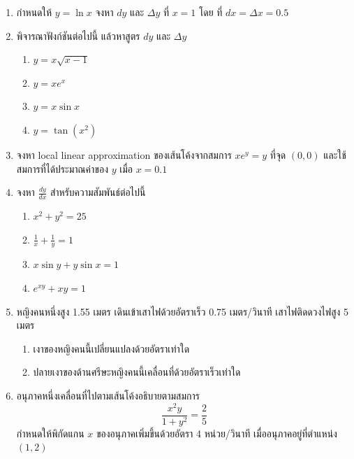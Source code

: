\documentclass[
]{book}
\begin{document}
\begin{enumerate}
\def\labelenumi{\arabic{enumi}.}
\item
  กำหนดให้ \(y= \ln x\) จงหา \(dy\) และ \(\Delta y\) ที่ \(x=1\) โดย ที่
  \(dx = \Delta x = 0.5\)
\item
  พิจารณาฟังก์ชันต่อไปนี้ แล้วหาสูตร \(dy\) และ \(\Delta y\)

  \begin{enumerate}
  \def\labelenumii{\arabic{enumii}.}
  \item
    \(\displaystyle y = x\sqrt{x-1}\)
  \item
    \(\displaystyle y = xe^x\)
  \item
    \(\displaystyle y = x\sin  x\)
  \item
    \(\displaystyle y = \tan (x^2)\)
  \end{enumerate}
\item
  จงหา local linear approximation ของเส้นโค้งจากสมการ \(xe^y = y\) ที่จุด
  \((0,0)\) และใช้สมการที่ได้ประมาณค่าของ \(y\) เมื่อ \(x=0.1\)
\item
  จงหา \(\frac{dy}{dx}\) สำหรับความสัมพันธ์ต่อไปนี้

  \begin{enumerate}
  \def\labelenumii{\arabic{enumii}.}
  \item
    \(x^2+ y^2 = 25\)
  \item
    \(\frac{1}{x} + \frac{1}{y} = 1\)
  \item
    \(x\sin y + y\sin x = 1\)
  \item
    \(e^{xy} + xy = 1\)
  \end{enumerate}
\item
  หญิงคนหนึ่งสูง 1.55 เมตร เดินเข้าเสาไฟด้วยอัตราเร็ว 0.75 เมตร/วินาที
  เสาไฟติดดวงไฟสูง 5 เมตร

  \begin{enumerate}
  \def\labelenumii{\arabic{enumii}.}
  \item
    เงาของหญิงคนนี้เปลี่ยนแปลงด้วยอัตราเท่าใด
  \item
    ปลายเงาของด้านศรีษะหญิงคนนี้เคลื่อนที่ด้วยอัตราเร็วเท่าใด
  \end{enumerate}
\item
  อนุภาคหนึ่งเคลื่อนที่ไปตามเส้นโค้งอธิบายตามสมการ
  \[\frac{x^2y}{1+y^2} = \frac{2}{5}\] กำหนดให้พิกัดแกน \(x\)
  ของอนุภาคเพิ่มขึ้นด้วยอัตรา 4 หน่วย/วินาที เมื่ออนุภาคอยู่ที่ตำแหน่ง \((1,2)\)


\end{enumerate}
\end{document}
